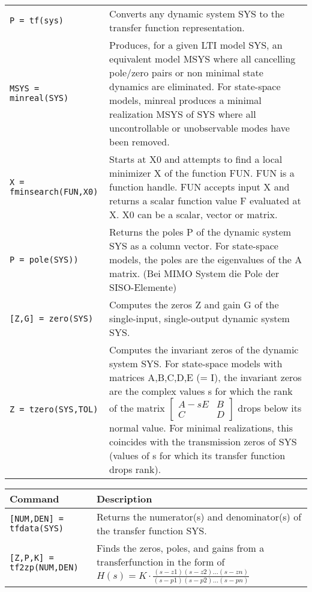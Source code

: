 \begin{center}
\begin{tabular}{p{5cm}|p{8cm}}
        \texttt{P = tf(sys)}  & Converts any dynamic system SYS to the transfer function representation. \\
        
        \texttt{MSYS = minreal(SYS)}  &  Produces, for a given LTI model SYS, an equivalent model MSYS where all cancelling pole/zero pairs or non minimal state dynamics are eliminated.  For state-space models, minreal produces a minimal realization MSYS of SYS where all uncontrollable or unobservable modes have been removed.\\
        
        \texttt{X = fminsearch(FUN,X0)}  &  Starts at X0 and attempts to find a local minimizer X of the function FUN.  FUN is a function handle.  FUN accepts input X and returns a scalar function value F evaluated at X. X0 can be a scalar, vector or matrix.\\
        
        \texttt{P = pole(SYS))}  & Returns the poles P of the dynamic system SYS as a column vector. For state-space models, the poles are the eigenvalues of the A matrix. (Bei MIMO System die Pole der SISO-Elemente) \\
        
        \texttt{[Z,G] = zero(SYS)} & Computes the zeros Z and gain G of the single-input, single-output dynamic system SYS.\\
        
        \texttt{Z = tzero(SYS,TOL)}  &  Computes the invariant zeros of the dynamic system SYS. For state-space models with matrices A,B,C,D,E (= I), the invariant zeros are the complex values s for which the rank of the matrix $\begin{bmatrix} A -sE & B\\ C & D\end{bmatrix}$ drops below its normal value. For minimal realizations, this coincides with the transmission zeros of SYS (values of s for which its transfer function drops rank).\\ 
        
    \end{tabular}
    \begin{tabular}{p{5cm}|p{8cm}}
        \textbf{Command}    &   \textbf{Description}\\
        \hline
        \texttt{[NUM,DEN] = tfdata(SYS)} & Returns the numerator(s) and denominator(s) of the transfer function SYS. \\
        
        \texttt{[Z,P,K] = tf2zp(NUM,DEN)} & Finds the zeros, poles, and gains from a transferfunction in the form of $\displaystyle H(s) = K\cdot\frac{(s-z1)(s-z2)\dots(s-zn)}{(s-p1)(s-p2)\dots(s-pn)}$\\
        

\end{tabular}
\end{center}
